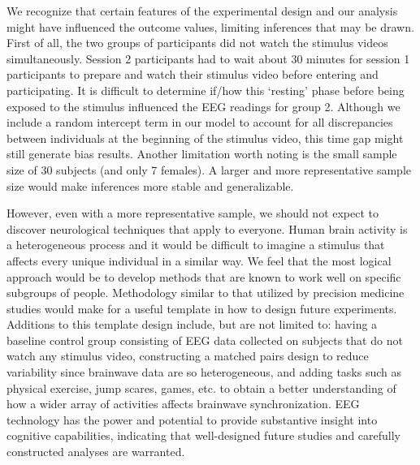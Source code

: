 \documentclass{article}[12pt]
\begin{document}
We recognize that certain features of the experimental design and our analysis might have influenced the outcome values, limiting inferences that may be drawn. First of all, the two groups of participants did not watch the stimulus videos simultaneously. Session 2 participants had to wait about 30 minutes for session 1 participants to prepare and watch their stimulus video before entering and participating. It is difficult to determine if/how this `resting' phase before being exposed to the stimulus influenced the EEG readings for group 2. Although we include a random intercept term in our model to account for all discrepancies between individuals at the beginning of the stimulus video, this time gap might still generate bias results. Another limitation worth noting is the small sample size of 30 subjects (and only 7 females). A larger and more representative sample size would make inferences more stable and generalizable.

However, even  with a more representative sample, we should not expect to discover neurological techniques that apply to everyone.  Human brain activity is a heterogeneous process and it would be difficult to imagine a stimulus that affects every unique individual in a similar way. We feel that the most logical approach would be to develop methods that are known to work well on specific subgroups of people.  Methodology similar to that utilized by precision medicine studies would make for a useful template in how to design future experiments.  Additions to this template design include, but are not limited to:
having a baseline control group consisting of EEG data collected on subjects that do not watch any stimulus video,
constructing a matched pairs design to reduce variability since brainwave data are so heterogeneous,
and adding tasks such as physical exercise, jump scares, games, etc. to obtain a better understanding of how a wider array of activities affects brainwave synchronization.
EEG technology has the power and potential to provide substantive insight into cognitive capabilities, indicating that well-designed future studies and carefully constructed analyses are warranted.






\end{document}
